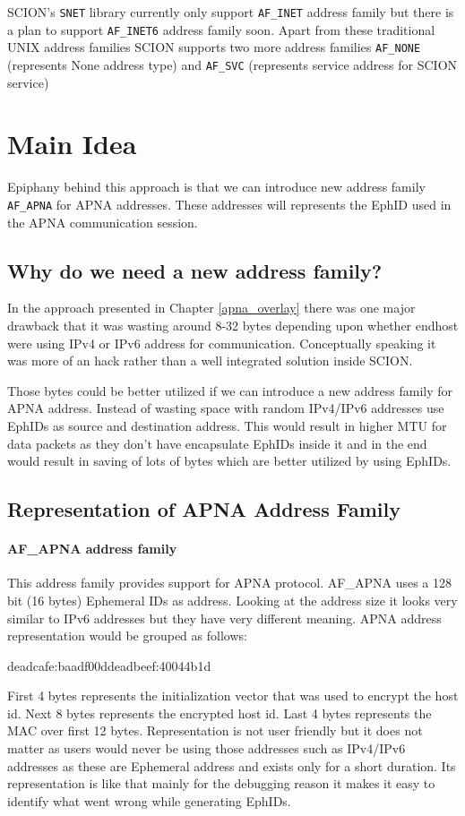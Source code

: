SCION's \texttt{SNET} library currently only support \texttt{AF\_INET} address family but there is a plan to support \texttt{AF\_INET6} address family soon. Apart from these traditional UNIX address families SCION supports two more address families \texttt{AF\_NONE} (represents None address type) and \texttt{AF\_SVC} (represents service address for SCION service) 

\section{Main Idea} \label{addr:main_idea}
Epiphany behind this approach is that we can introduce new address family \texttt{AF\_APNA} for APNA addresses. These addresses will represents the EphID used in the APNA communication session.

\subsection{Why do we need a new address family?}
In the approach presented in Chapter \ref{apna_overlay} there was one major drawback that it was wasting around 8-32 bytes depending upon whether endhost were using IPv4 or IPv6 address for communication. Conceptually speaking it was more of an hack rather than a well integrated solution inside SCION. 

Those bytes could be better utilized if we can introduce a new address family for APNA address. Instead of wasting space with random IPv4/IPv6 addresses use EphIDs as source and destination address. This would result in higher MTU for data packets as they don't have encapsulate EphIDs inside it and in the end would result in saving of lots of bytes which are better utilized by using EphIDs.

\subsection{Representation of APNA Address Family}
\paragraph{AF\_APNA address family}
This address family provides support for APNA protocol. AF\_APNA uses a 128 bit (16 bytes) Ephemeral IDs as address. Looking at the address size it looks very similar to IPv6 addresses but they have very different meaning. APNA address representation would be grouped as follows:
\begin{center}
deadcafe:baadf00ddeadbeef:40044b1d
\end{center}
First 4 bytes represents the initialization vector that was used to encrypt the host id. Next 8 bytes represents the encrypted host id. Last 4 bytes represents the MAC over first 12 bytes. Representation is not user friendly but it does not matter as users would never be using those addresses such as IPv4/IPv6 addresses as these are Ephemeral address and exists only for a short duration. Its representation is like that mainly for the debugging reason it makes it easy to identify what went wrong while generating EphIDs.

